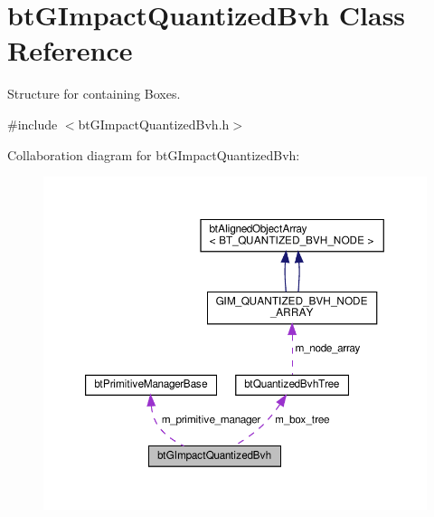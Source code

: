 \hypertarget{classbtGImpactQuantizedBvh}{}\section{bt\+G\+Impact\+Quantized\+Bvh Class Reference}
\label{classbtGImpactQuantizedBvh}


Structure for containing Boxes.  




{\ttfamily \#include $<$bt\+G\+Impact\+Quantized\+Bvh.\+h$>$}



Collaboration diagram for bt\+G\+Impact\+Quantized\+Bvh\+:
\nopagebreak
\begin{figure}[H]
\begin{center}
\leavevmode
\includegraphics[width=350pt]{classbtGImpactQuantizedBvh__coll__graph}
\end{center}
\end{figure}

